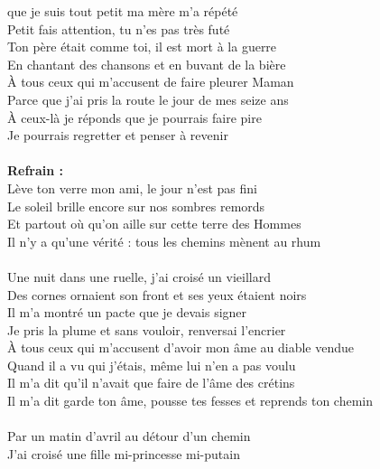 
 que je suis tout petit ma mère m'a répété
\\Petit fais attention, tu n'es pas très futé
\\Ton père était comme toi, il est mort à la guerre
\\En chantant des chansons et en buvant de la bière
\\À tous ceux qui m'accusent de faire pleurer Maman
\\Parce que j'ai pris la route le jour de mes seize ans
\\À ceux-là je réponds que je pourrais faire pire
\\Je pourrais regretter et penser à revenir
\\\\\textbf{Refrain :}
\\Lève ton verre mon ami, le jour n'est pas fini
\\Le soleil brille encore sur nos sombres remords
\\Et partout où qu'on aille sur cette terre des Hommes
\\Il n'y a qu'une vérité : tous les chemins mènent au rhum
\\\\Une nuit dans une ruelle, j'ai croisé un vieillard
\\Des cornes ornaient son front et ses yeux étaient noirs
\\Il m'a montré un pacte que je devais signer
\\Je pris la plume et sans vouloir, renversai l'encrier
\\À tous ceux qui m'accusent d'avoir mon âme au diable vendue
\\Quand il a vu qui j'étais, même lui n'en a pas voulu
\\Il m'a dit qu'il n'avait que faire de l'âme des crétins
\\Il m'a dit garde ton âme, pousse tes fesses et reprends ton chemin
\\\\Par un matin d'avril au détour d'un chemin
\\J'ai croisé une fille mi-princesse mi-putain
